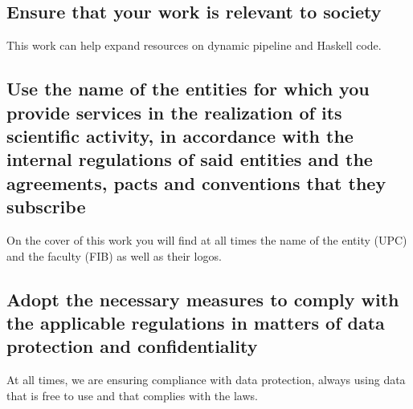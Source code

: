 \subsection*{Ensure that your work is relevant to society}
This work can help expand resources on dynamic pipeline and Haskell code.

\subsection*{Use the name of the entities for which you provide services in the realization of its scientific activity, in accordance with the internal regulations of said entities and the agreements, pacts and conventions that they subscribe}
On the cover of this work you will find at all times the name of the entity (UPC) and the faculty (FIB) as well as their logos. 

\subsection*{Adopt the necessary measures to comply with the applicable regulations in matters of data protection and confidentiality}
At all times, we are ensuring compliance with data protection, always using data that is free to use and that complies with the laws.